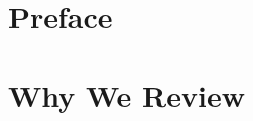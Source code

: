 \documentclass[11pt,twoside]{article}
\begin{document}
\tableofcontents
\clearpage
\section{Preface}
\section{Why We Review}
\lipsum
\lipsum
\lipsum
\lipsum

\layout
\clearpage
\layout
\end{document}
